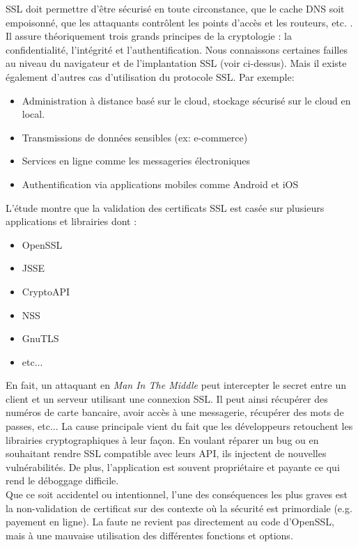 SSL doit permettre d'être sécurisé en toute circonstance, que le cache DNS soit empoisonné, que les attaquants contrôlent les points d'accès et les routeurs, etc. . Il assure théoriquement trois grands principes de la cryptologie : la confidentialité, l'intégrité et l'authentification. Nous connaissons certaines failles au niveau du navigateur et de l'implantation SSL (voir ci-dessus). Mais il existe également d'autres cas d'utilisation du protocole SSL. Par exemple:
\begin{itemize}
\item Administration à distance basé sur le cloud, stockage sécurisé sur le cloud en local.
\item Transmissions de données sensibles (ex: e-commerce)
\item Services en ligne comme les messageries électroniques
\item Authentification via applications mobiles comme Android et iOS\\
\end{itemize}

L'étude montre que la validation des certificats SSL est casée sur plusieurs applications et librairies dont :
\begin{itemize}
\item OpenSSL
\item JSSE
\item CryptoAPI
\item NSS
\item GnuTLS
\item etc...\\
\end{itemize}

En fait, un attaquant en \textit{Man In The Middle} peut intercepter le secret entre un client et un serveur utilisant une connexion SSL. Il peut ainsi récupérer des numéros de carte bancaire, avoir accès à une messagerie, récupérer des mots de passes, etc... La cause principale vient du fait que les développeurs retouchent les librairies cryptographiques à leur façon. En voulant réparer un bug ou en souhaitant rendre SSL compatible avec leurs API, ils injectent de nouvelles vulnérabilités. De plus, l'application est souvent propriétaire et payante ce qui rend le déboggage difficile.\\


Que ce soit accidentel ou intentionnel, l'une des conséquences les plus graves est la non-validation de certificat sur des contexte où la sécurité est primordiale (e.g. payement en ligne). La faute ne revient pas directement au code d'OpenSSL, mais à une mauvaise utilisation des différentes fonctions et options.\\


